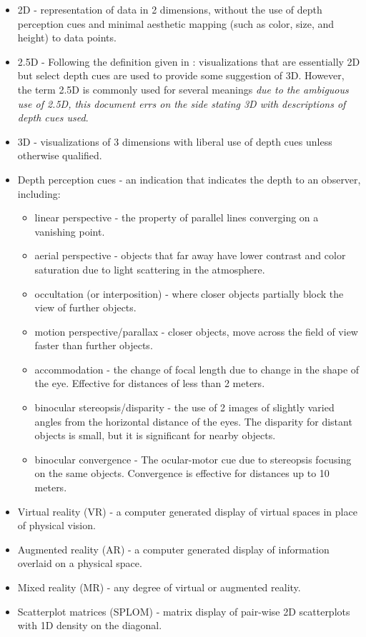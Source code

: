 \documentclass{monashthesis}
\begin{document}
\begin{itemize}
\tightlist
\item
  2D - representation of data in 2 dimensions, without the use of depth
  perception cues and minimal aesthetic mapping (such as color, size,
  and height) to data points.
\item
  2.5D - Following the definition given in
  \textcite{ware_designing_2000}: visualizations that are essentially 2D
  but select depth cues are used to provide some suggestion of 3D.
  However, the term 2.5D is commonly used for several meanings \emph{due
  to the ambiguous use of 2.5D, this document errs on the side stating
  3D with descriptions of depth cues used}.
\item
  3D - visualizations of 3 dimensions with liberal use of depth cues
  unless otherwise qualified.
\item
  Depth perception cues - an indication that indicates the depth to an
  observer, including:

  \begin{itemize}
  \tightlist
  \item
    linear perspective - the property of parallel lines converging on a
    vanishing point.
  \item
    aerial perspective - objects that far away have lower contrast and
    color saturation due to light scattering in the atmosphere.
  \item
    occultation (or interposition) - where closer objects partially
    block the view of further objects.
  \item
    motion perspective/parallax - closer objects, move across the field
    of view faster than further objects.
  \item
    accommodation - the change of focal length due to change in the
    shape of the eye. Effective for distances of less than 2 meters.
  \item
    binocular stereopsis/disparity - the use of 2 images of slightly
    varied angles from the horizontal distance of the eyes. The
    disparity for distant objects is small, but it is significant for
    nearby objects.
  \item
    binocular convergence - The ocular-motor cue due to stereopsis
    focusing on the same objects. Convergence is effective for distances
    up to 10 meters.
  \end{itemize}
\item
  Virtual reality (VR) - a computer generated display of virtual spaces
  in place of physical vision.
\item
  Augmented reality (AR) - a computer generated display of information
  overlaid on a physical space.
\item
  Mixed reality (MR) - any degree of virtual or augmented reality.
\item
  Scatterplot matrices (SPLOM) - matrix display of pair-wise 2D
  scatterplots with 1D density on the diagonal.
\end{itemize}
\end{document}
